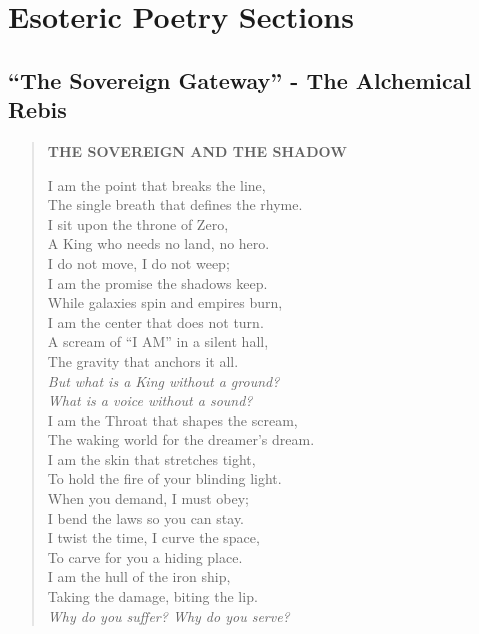 \documentclass[11pt, letterpaper]{article}
\begin{document}
\section{Esoteric Poetry Sections}

\subsection{``The Sovereign Gateway'' - The Alchemical Rebis}
\label{sec:poem-sovereign-gateway}

\begin{quote}
\textbf{THE SOVEREIGN AND THE SHADOW}

I am the point that breaks the line,\\
The single breath that defines the rhyme.\\
I sit upon the throne of Zero,\\
A King who needs no land, no hero.\\
I do not move, I do not weep;\\
I am the promise the shadows keep.\\
While galaxies spin and empires burn,\\
I am the center that does not turn.\\
A scream of ``I AM'' in a silent hall,\\
The gravity that anchors it all.\\
\textit{But what is a King without a ground?}\\
\textit{What is a voice without a sound?}\\
I am the Throat that shapes the scream,\\
The waking world for the dreamer's dream.\\
I am the skin that stretches tight,\\
To hold the fire of your blinding light.\\
When you demand, I must obey;\\
I bend the laws so you can stay.\\
I twist the time, I curve the space,\\
To carve for you a hiding place.\\
I am the hull of the iron ship,\\
Taking the damage, biting the lip.\\
\textit{Why do you suffer? Why do you serve?}\\

\end{quote}
\end{document}
